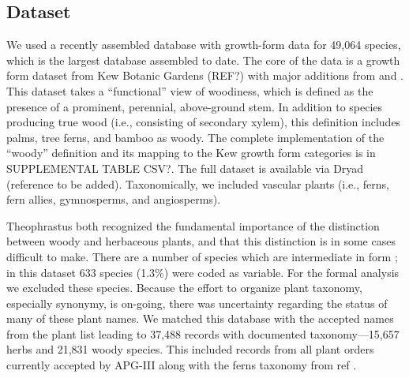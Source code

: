 \documentclass[12pt]{article}
\begin{document}
\subsection{Dataset}



We used a recently assembled database with growth-form data for
49,064 species, which is the largest database assembled to date.
%
% 
The core of the data is a growth form dataset from Kew Botanic Gardens
(REF?) with major additions from \citep{Molesheihgt} and \cite{apweb}.
This dataset takes a ``functional'' view of woodiness, which is
defined as the presence of a prominent, perennial, above-ground stem.
In addition to species producing true wood (i.e., consisting of
secondary xylem), this definition includes palms, tree ferns, and
bamboo as woody.  The complete implementation of the ``woody''
definition and its mapping to the Kew growth form categories is in
SUPPLEMENTAL TABLE CSV?.  The full dataset is %
available via Dryad (reference to be added).  Taxonomically, we
included vascular plants (i.e., ferns, fern allies, gymnosperms, and
angiosperms).

Theophrastus both recognized the fundamental importance of the
distinction between woody and herbaceous plants, and that this
distinction is in some cases difficult to make.  There are a number of
species which are intermediate in form \citep{beaulieuHiddenRates}; in
this dataset 633 species (1.3\%) were coded as variable.  For the
formal analysis we excluded these species. Because the effort to
organize plant taxonomy, especially synonymy, is on-going, there was
uncertainty regarding the status of many of these plant names.  We
matched this database with the accepted names from the plant list
\citep{ThePlantList} leading to 37,488 records with documented
taxonomy---15,657 herbs and 21,831 woody species.  This included
records from all plant orders currently accepted by APG-III
\citep{APG3} along with the ferns taxonomy from ref \cite{apweb}.
\end{document}
